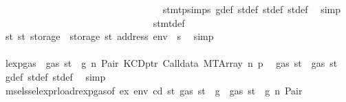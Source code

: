 \begin{isabellebody}
\ \ \ \ \ \ \ \ \ \ \ \ \ \ \ \ \ \ \ \ \ \ \ \ \ \ \ \ \ \ \ \ \isamarkupfalse%
\ stmt{\isachardot}{\kern0pt}psimps{\isacharparenleft}{\kern0pt}{}{\isacharparenright}{\kern0pt}\ g{\isacharunderscore}{\kern0pt}def\ st{\isacharprime}{\kern0pt}{\isacharunderscore}{\kern0pt}def\ st{\isacharprime}{\kern0pt}{\isacharprime}{\kern0pt}{\isacharunderscore}{\kern0pt}def\ st{\isacharprime}{\kern0pt}{\isacharprime}{\kern0pt}{\isacharprime}{\kern0pt}{\isacharunderscore}{\kern0pt}def\ \isamarkupfalse%
\ simp\isanewline
\ \ \ \ \ \ \ \ \ \ \ \ \ \ \ \ \ \ \ \ \ \ \ \ \ \ \ \ \ \ \isamarkupfalse%
\ stmt{\isacharunderscore}{\kern0pt}def\ \isamarkupfalse%
\ {\isachardoublequoteopen}st{}{\isacharprime}{\kern0pt}{\isacharequal}{\kern0pt}\ st{\isacharprime}{\kern0pt}{\isacharprime}{\kern0pt}{\isacharprime}{\kern0pt}\ {\isasymlparr}storage\ {\isacharcolon}{\kern0pt}{\isacharequal}{\kern0pt}\ {\isacharparenleft}{\kern0pt}storage\ st{\isacharprime}{\kern0pt}{\isacharprime}{\kern0pt}{\isacharparenright}{\kern0pt}\ {\isacharparenleft}{\kern0pt}address\ env\ {\isacharcolon}{\kern0pt}{\isacharequal}{\kern0pt}\ s{\isacharprime}{\kern0pt}{\isacharparenright}{\kern0pt}{\isasymrparr}{\isachardoublequoteclose}\ \isamarkupfalse%
\ simp\isanewline
\ \ \ \ \ \ \ \ \ \ \ \ \ \ \ \ \ \ \ \ \ \ \ \ \ \ \ \ \ \ \isamarkupfalse%
\ \isamarkupfalse%
\ lexp{\isacharunderscore}{\kern0pt}gas\ {\isacharbackquoteopen}{\isasymnot}\ gas\ st\ {\isasymle}\ g{\isacharbackquoteclose}\ n\ Pair\ KCDptr\ Calldata\ MTArray\ n{}\ p{}\ \isamarkupfalse%
\ {\isachardoublequoteopen}gas\ st{\isacharprime}{\kern0pt}{\isacharprime}{\kern0pt}{\isacharprime}{\kern0pt}\ {\isasymle}\ gas\ st{\isacharprime}{\kern0pt}{\isacharprime}{\kern0pt}{\isachardoublequoteclose}\ \isamarkupfalse%
\ g{\isacharunderscore}{\kern0pt}def\ st{\isacharprime}{\kern0pt}{\isacharprime}{\kern0pt}{\isacharunderscore}{\kern0pt}def\ st{\isacharprime}{\kern0pt}{\isacharprime}{\kern0pt}{\isacharprime}{\kern0pt}{\isacharunderscore}{\kern0pt}def\ \isamarkupfalse%
\ simp\isanewline
\ \ \ \ \ \ \ \ \ \ \ \ \ \ \ \ \ \ \ \ \ \ \ \ \ \ \ \ \ \ \isamarkupfalse%
\ \isamarkupfalse%
\ msel{\isacharunderscore}{\kern0pt}ssel{\isacharunderscore}{\kern0pt}expr{\isacharunderscore}{\kern0pt}load{\isacharunderscore}{\kern0pt}rexp{\isacharunderscore}{\kern0pt}gas{\isacharparenleft}{\kern0pt}{}{\isacharparenright}{\kern0pt}{\isacharbrackleft}{\kern0pt}of\ ex\ env\ cd\ st{\isacharprime}{\kern0pt}\ {\isachardoublequoteopen}gas\ st\ {\isacharminus}{\kern0pt}\ g{\isachardoublequoteclose}{\isacharbrackright}{\kern0pt}\ {\isacharbackquoteopen}{\isasymnot}\ gas\ st\ {\isasymle}\ g{\isacharbackquoteclose}\ n\ Pair\ \isamarkupfalse%

\end{isabellebody}

